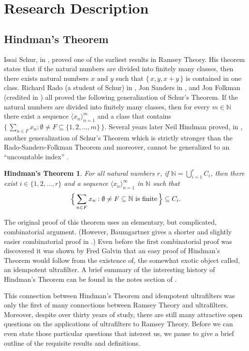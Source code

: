 \documentclass[12pt]{article}
\theoremstyle{plain}
\newtheorem{fst}[thm]{Hindman's Theorem}
\theoremstyle{definition}
\newcommand{\bbN}{\mathbb{N}}
\newcommand{\la}{\langle}
\newcommand{\ra}{\rangle}
\begin{document}
\section{Research Description}
\subsection{Hindman's Theorem}
Issai Schur, in \cite{Schur:1916fk}, proved one of the earliest
results in Ramsey Theory. 
His theorem states that if the natural numbers are divided into
finitely many classes, then there exists natural numbers $x$ and $y$
such that $\{\, x, y, x+y \,\}$ is contained in one class.
Richard Rado (a student of Schur) in \cite{Rado:1933kx}, Jon Sanders
in \cite{Sanders:1968uq}, and Jon Folkman (credited in
\cite{Graham:1971vn}) all proved the following generalization of
Schur's Theorem.
If the natural numbers are divided into finitely many classes, then
for every $m \in \bbN$ there exist a sequence $\la x_n \ra_{n=1}^m$
and a class that contains $\bigl\{\, \sum_{n \in F} x_n : \emptyset
\ne F\subseteq \{1, 2, \ldots, m\} \,\bigr\}$.
Several years later Neil Hindman proved, in \cite{Hindman:1974ys},
another generalization of Schur's Theorem which is strictly stronger
than the Rado-Sanders-Folkman Theorem \cite[Theorems 16.28 and
16.29]{Hindman:1998fk} and moreover, cannot be generalized to an
``uncountable index'' \cite{Milliken:1978fk}.
  \begin{fst}
    For all natural numbers $r$, if \/ $\bbN = \bigcup_{i=1}^r C_i$, then
    there exist $i \in \{1, 2, \ldots, r\}$ and a sequence $\la x_n
    \ra_{n=1}^\infty$ in $\bbN$ such that
      \[
        \Bigl\{\, \sum_{n\in F} x_n : \emptyset \ne F \subseteq \bbN
        \hbox{ is finite} \,\Bigr\} \subseteq C_i.
      \]
  \end{fst}

The original proof of this theorem uses an elementary, but
complicated, combinatorial argument. 
(However, Baumgartner gives a shorter and slightly easier
combinatorial proof in \cite{Baumgartner:1974uq}.)
Even before the first combinatorial proof was discovered it was shown
by Fred Galvin that an easy proof of Hindman's Theorem would follow
from the existence of, the somewhat exotic object called, an idempotent
ultrafilter. 
A brief summary of the interesting history of Hindman's Theorem can be
found in the notes section of \cite[Chapter 5]{Hindman:1998fk}. 

This connection between Hindman's Theorem and idempotent ultrafilters
was only the first of many connections between Ramsey Theory and
ultrafilters.
Moreover, despite over thirty years of study, there are still many
attractive open questions on the applications of ultrafilters to
Ramsey Theory. 
Before we can even state those particular questions that interest us,
we pause to give a brief outline of the requisite results and
definitions. 
\end{document}
